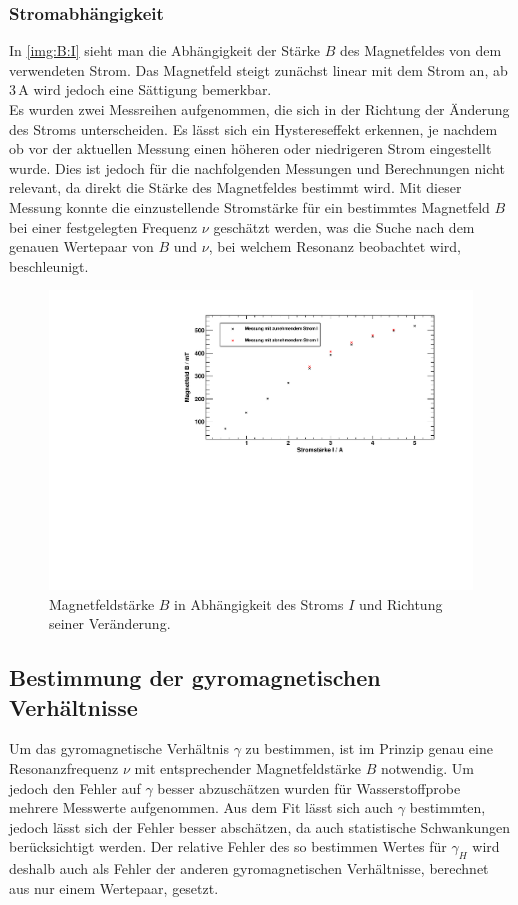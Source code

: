 \subsubsection{Stromabhängigkeit}
In \autoref{img:B:I} sieht man die Abhängigkeit der Stärke $B$ des Magnetfeldes von dem verwendeten Strom. 
Das Magnetfeld steigt zunächst linear mit dem Strom an, ab 3\,A wird jedoch eine Sättigung bemerkbar. \\
Es wurden zwei Messreihen aufgenommen, die 
sich in der Richtung der Änderung des Stroms unterscheiden. Es lässt sich ein Hystereseffekt erkennen, je nachdem ob vor der aktuellen Messung 
einen höheren oder niedrigeren Strom eingestellt wurde. Dies ist jedoch für die nachfolgenden Messungen und Berechnungen nicht relevant, da direkt 
die Stärke des Magnetfeldes bestimmt wird. Mit dieser Messung konnte die einzustellende Stromstärke für ein bestimmtes Magnetfeld $B$ bei einer 
festgelegten Frequenz $\nu$ geschätzt werden, was die Suche nach dem genauen Wertepaar von $B$ und $\nu$, bei welchem Resonanz beobachtet wird, 
beschleunigt.
\begin{figure}[H]
\begin{center}
  \includegraphics[width=\textwidth]{../img/02-B-I.pdf}
  \caption{Magnetfeldstärke $B$ in Abhängigkeit des Stroms $I$ und Richtung seiner Veränderung.}
  \label{img:B:I}
\end{center}
\end{figure}

\subsection{Bestimmung der gyromagnetischen Verhältnisse}
Um das gyromagnetische Verhältnis $\gamma$ zu bestimmen, ist im Prinzip genau eine Resonanzfrequenz $\nu$ mit entsprechender Magnetfeldstärke $B$ notwendig. 
Um jedoch den Fehler auf $\gamma$ besser abzuschätzen wurden für Wasserstoffprobe mehrere Messwerte aufgenommen. Aus dem Fit lässt sich auch $\gamma$ 
bestimmten, jedoch lässt sich der Fehler besser abschätzen, da auch statistische Schwankungen berücksichtigt werden. Der relative Fehler des so 
bestimmen Wertes für $\gamma_H$ wird deshalb auch als Fehler der anderen gyromagnetischen Verhältnisse, berechnet aus nur einem Wertepaar, gesetzt.
